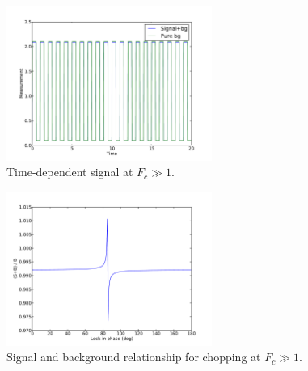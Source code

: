 \documentclass[10pt,a4paper]{article}
\begin{document}
\begin{figure}[h]
\centering
\includegraphics[width=0.6\textwidth]{figures/cpt02a.pdf}
\caption{Time-dependent signal at $F_c \gg 1$.}
\label{fig:choptime2}
\end{figure}
\begin{figure}[h]
\centering
\includegraphics[width=0.6\textwidth]{figures/cpt02b.pdf}
\caption{Signal and background relationship for chopping at $F_c \gg 1$.}
\label{fig:chopphase2}
\end{figure}



\end{document}
